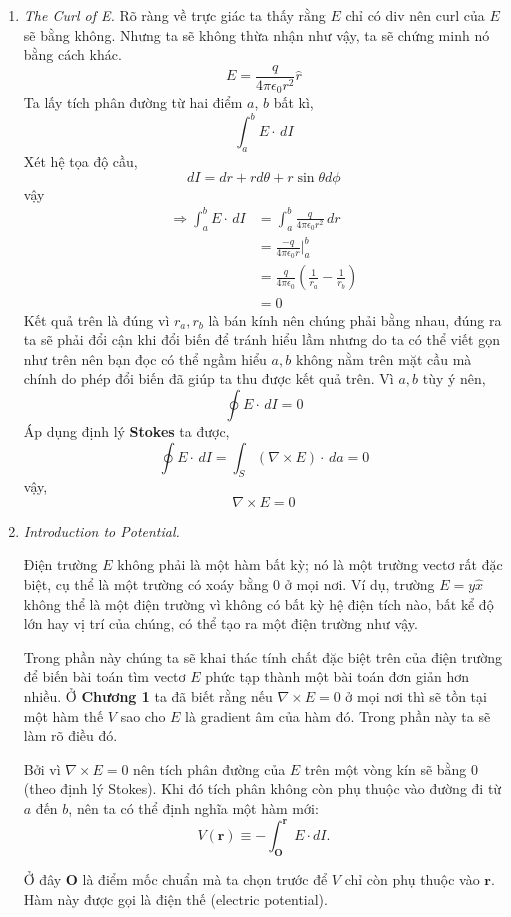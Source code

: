 \begin{enumerate}
\item \textit{The Curl of E.}
Rõ ràng về trực giác ta thấy rằng $E$ chỉ có div nên curl của $E$ sẽ bằng không. Nhưng ta sẽ không thừa nhận như vậy, ta sẽ chứng minh nó bằng cách khác.
\[
E = \frac{q}{4\pi\epsilon_{0}r^2}\hat{r}
\]
Ta lấy tích phân đường từ hai điểm $a$, $b$ bất kì,
\[
\int_{a}^{b} E \cdot \, dI
\]
Xét hệ tọa độ cầu,
\[
dI = dr + rd\theta + r\sin{\theta}d\phi 
\]
vậy
\begin{align*}
\Rightarrow \int_{a}^{b} E \cdot \, dI &= \int_{a}^{b} \frac{q}{4\pi\epsilon_{0}r^2} \, dr \\[6pt]
&= \frac{-q}{4\pi\epsilon_{0}r} \Big|_{a}^{b}\\[6pt]
&= \frac{q}{4\pi\epsilon_{0}}(\frac{1}{r_{a}} - \frac{1}{r_{b}})\\[6pt]
&= 0
\end{align*}
Kết quả trên là đúng vì $r_{a},r_{b}$ là bán kính nên chúng phải bằng nhau, đúng ra ta sẽ phải đổi cận khi đổi biến để tránh hiểu lầm nhưng do ta có thể viết gọn như trên nên bạn đọc có thể ngầm hiểu $a,b$ không nằm trên mặt cầu mà chính do phép đổi biến đã giúp ta thu được kết quả trên. Vì $a,b$ tùy ý nên,
\[
\oint E \cdot \, dI = 0
\]
Áp dụng định lý \textbf{Stokes} ta được,
\[
\oint E \cdot \, dI = \int_{S} (\nabla \times E) \cdot \, da = 0
\]
vậy,
\[
\boxed{\nabla \times E = 0} 
\]

\item \textit{Introduction to Potential.}

Điện trường $E$ không phải là một hàm bất kỳ; nó là một trường vectơ rất đặc biệt, cụ thể là một trường có xoáy bằng $0$ ở mọi nơi. Ví dụ, trường $E = y\hat{x}$ không thể là một điện trường vì không có bất kỳ hệ điện tích nào, bất kể độ lớn hay vị trí của chúng, có thể tạo ra một điện trường như vậy.

Trong phần này chúng ta sẽ khai thác tính chất đặc biệt trên của điện trường để biến bài toán tìm vectơ $E$ phức tạp thành một bài toán đơn giản hơn nhiều. Ở \textbf{Chương 1} ta đã biết rằng nếu $\nabla \times E = 0$ ở mọi nơi thì sẽ tồn tại một hàm thế $V$ sao cho $E$ là gradient âm của hàm đó. Trong phần này ta sẽ làm rõ điều đó.

Bởi vì $\nabla \times E = 0$ nên tích phân đường của $E$ trên một vòng kín sẽ bằng $0$ (theo định lý Stokes). Khi đó tích phân không còn phụ thuộc vào đường đi từ $a$ đến $b$, nên ta có thể định nghĩa một hàm mới:
\[
V(\mathbf{r}) \equiv -\int_{\mathbf{O}}^{\mathbf{r}} E \cdot dI .
\]

Ở đây $\mathbf{O}$ là điểm mốc chuẩn mà ta chọn trước để $V$ chỉ còn phụ thuộc vào $\mathbf{r}$. Hàm này được gọi là điện thế (electric potential).


\end{enumerate}
